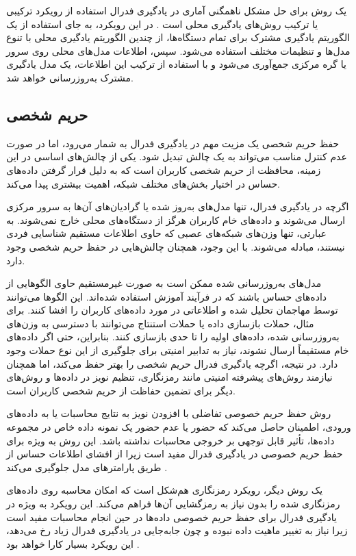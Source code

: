 یک روش برای حل مشکل ناهمگنی آماری در یادگیری فدرال استفاده از رویکرد ترکیبی یا ترکیب روش‌های یادگیری محلی است
\cite{konevcny2015federated}.
در این رویکرد، به جای استفاده از یک الگوریتم یادگیری مشترک برای تمام دستگاه‌ها، از چندین الگوریتم یادگیری محلی با تنوع مدل‌ها و تنظیمات مختلف استفاده می‌شود. سپس، اطلاعات مدل‌های محلی روی سرور یا گره مرکزی جمع‌آوری می‌شود و با استفاده از ترکیب این اطلاعات، یک مدل یادگیری مشترک به‌روزرسانی خواهد شد.



\subsection{حریم شخصی}
حفظ حریم شخصی یک مزیت مهم در یادگیری فدرال به شمار می‌رود، اما در صورت عدم کنترل مناسب می‌تواند به یک چالش تبدیل شود. یکی از چالش‌های اساسی در این زمینه، محافظت از حریم شخصی کاربران است که به دلیل قرار گرفتن داده‌های حساس در اختیار بخش‌های مختلف شبکه، اهمیت بیشتری پیدا می‌کند.

اگرچه در یادگیری فدرال، تنها مدل‌های به‌روز شده یا گرادیان‌های آن‌ها به سرور مرکزی ارسال می‌شوند و داده‌های خام کاربران هرگز از دستگاه‌های محلی خارج نمی‌شوند. به عبارتی، تنها وزن‌های شبکه‌های عصبی که حاوی اطلاعات مستقیم شناسایی فردی نیستند، مبادله می‌شوند. با این وجود، همچنان چالش‌هایی در حفظ حریم شخصی وجود دارد. 

مدل‌های به‌روزرسانی‌ شده ممکن است به صورت غیرمستقیم حاوی الگوهایی از داده‌های حساس باشند که در فرآیند آموزش استفاده شده‌اند. این الگوها می‌توانند توسط مهاجمان تحلیل شده و اطلاعاتی در مورد داده‌های کاربران را افشا کنند. برای مثال، حملات بازسازی داده یا حملات استنتاج می‌توانند با دسترسی به وزن‌های به‌روزرسانی شده، داده‌های اولیه را تا حدی بازسازی کنند. بنابراین، حتی اگر داده‌های خام مستقیماً ارسال نشوند، نیاز به تدابیر امنیتی برای جلوگیری از این نوع حملات وجود دارد. در نتیجه، اگرچه یادگیری فدرال حریم شخصی را بهتر حفظ می‌کند، اما همچنان نیازمند روش‌های پیشرفته امنیتی مانند رمزنگاری، تنظیم نویز در داده‌ها و روش‌های دیگر برای تضمین حفاظت از حریم شخصی کاربران است.


روش حفظ حریم خصوصی تفاضلی%
با افزودن نویز به نتایج محاسبات یا به داده‌های ورودی، اطمینان حاصل می‌کند که حضور یا عدم حضور یک نمونه داده خاص در مجموعه داده‌ها، تأثیر قابل توجهی بر خروجی محاسبات نداشته باشد. این روش به ویژه برای حفظ حریم خصوصی در یادگیری فدرال مفید است زیرا از افشای اطلاعات حساس از طریق پارامترهای مدل جلوگیری می‌کند
\cite{hasan2023security}.

یک روش دیگر، رویکرد رمزنگاری هم‌شکل%
است که امکان محاسبه روی داده‌های رمزنگاری شده را بدون نیاز به رمزگشایی آن‌ها فراهم می‌کند. این رویکرد به ویژه در یادگیری فدرال برای حفظ حریم خصوصی داده‌ها در حین انجام محاسبات مفید است زیرا نیاز به تغییر ماهیت داده نبوده و چون جابه‌جایی در یادگیری فدرال زیاد رخ می‌دهد، این رویکرد بسیار کارا خواهد بود
\cite{yin2021comprehensive}.



